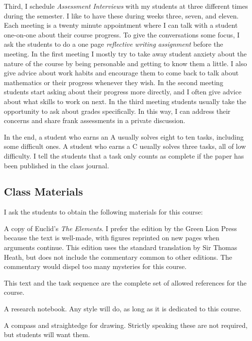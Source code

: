 \documentclass{tufte-handout}
\theoremstyle{definition}
\begin{document}
Third, I schedule \emph{Assessment Interviews} with my students at three different times during the semester. I like to have these during weeks three, seven, and eleven. Each meeting is a twenty minute appointment where I can talk with a student one-on-one about their course progress. To give the conversations some focus, I ask the students to do a one page \emph{reflective writing assignment} before the meeting.
In the first meeting I mostly try to take away student anxiety about the nature of the course by being personable and getting to know them a little. I also give advice about work habits and encourage them to come back to talk about mathematics or their progress whenever they wish. In the second meeting students start asking about their progress more directly, and I often give advice about what skills to work on next. In the third meeting students usually take the opportunity to ask about grades specifically. In this way, I can address their concerns and share frank assessments in a private discussion.

In the end, a student who earns an A usually solves eight to ten tasks, including some difficult ones. A student who earns a C usually solves three tasks, all of low difficulty. I tell the students that a task only counts as complete if the paper has been published in the class journal.

\subsection{Class Materials}

I ask the students to obtain the following materials for this course:
\begin{compactitem}
\item A copy of Euclid's \emph{The Elements}. I prefer the edition by the Green Lion Press\cite{Euclid} because the text is well-made, with figures reprinted on new pages when arguments continue. This edition uses the standard translation by Sir Thomas Heath, but does not include the commentary common to other editions. The commentary would dispel too many mysteries for this course.

This text and the task sequence are the complete set of allowed references for the course. 

\item A research notebook. Any style will do, as long as it is dedicated to this course.
\item A compass and straightedge for drawing. Strictly speaking these are not required, but students will want them.
\end{compactitem}
\end{document}
